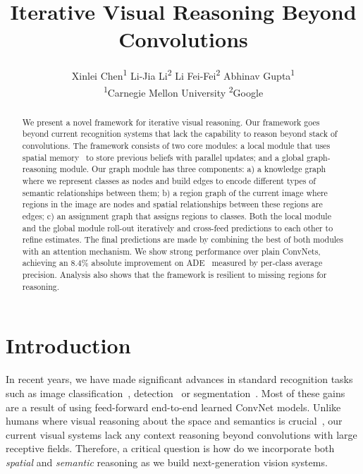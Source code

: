 \documentclass[10pt,twocolumn,letterpaper]{article}
\begin{document}
\title{Iterative Visual Reasoning Beyond Convolutions}

\author{Xinlei Chen\textsuperscript{1} \qquad Li-Jia Li\textsuperscript{2} \qquad Li Fei-Fei\textsuperscript{2} \qquad Abhinav Gupta\textsuperscript{1} \\
\textsuperscript{1}Carnegie Mellon University \qquad \textsuperscript{2}Google
}

\maketitle

\begin{abstract}
   We present a novel framework for iterative visual reasoning. Our framework goes beyond current recognition systems that lack the capability to reason beyond stack of convolutions. The framework consists of two core modules: a local module that uses spatial memory~\cite{chen2017spatial} to store previous beliefs with parallel updates; and a global graph-reasoning module. Our graph module has three components: a) a knowledge graph where we represent classes as nodes and build edges to encode different types of semantic relationships between them; b) a region graph of the current image where regions in the image are nodes and spatial relationships between these regions are edges; c) an assignment graph that assigns regions to classes. Both the local module and the global module roll-out iteratively and cross-feed predictions to each other to refine estimates. The final predictions are made by combining the best of both modules with an attention mechanism. We show strong performance over plain ConvNets, \eg achieving an $8.4\%$ absolute improvement on ADE~\cite{zhou2016semantic} measured by per-class average precision. Analysis also shows that the framework is resilient to missing regions for reasoning. 
\end{abstract}

\vspace{-0.05in}
\section{Introduction}
\vspace{-0.05in}
In recent years, we have made significant advances in standard recognition tasks such as image classification~\cite{he2016deep}, detection~\cite{ren2015faster} or segmentation~\cite{chen2016attention}. Most of these gains are a result of using feed-forward end-to-end learned ConvNet models. Unlike humans where visual reasoning about the space and semantics is crucial~\cite{biederman1982scene}, our current visual systems lack any context reasoning beyond convolutions with large receptive fields. Therefore, a critical question is how do we incorporate both \emph{spatial} and \emph{semantic} reasoning as we build next-generation vision systems.
\end{document}

